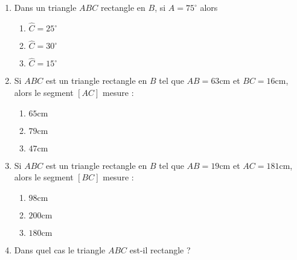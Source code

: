 \documentclass[oneside,twoside]{book}
\begin{document}
\begin{enumerate}
\begin{enumerate}
\end{enumerate}




\item Dans un triangle $ABC$ rectangle en $B$, si $\widehat{A}=75^{\circ}$ alors

\begin{enumerate}

\item\MauvaiseReponse $\widehat{C}=25^{\circ}$

\item\MauvaiseReponse $\widehat{C}=30^{\circ}$

\item\BonneReponse $\widehat{C}=15^{\circ}$

\end{enumerate}



\item Si $ABC$ est un triangle rectangle en $B$ tel que $AB=63\mathrm{cm}$ et $BC=16\mathrm{cm}$, alors le segment $\left[AC\right]$ mesure :

\begin{enumerate}

\item\BonneReponse $65\mathrm{cm}$

\item\MauvaiseReponse $79\mathrm{cm}$

\item\MauvaiseReponse $47\mathrm{cm}$

\end{enumerate}



\item Si $ABC$ est un triangle rectangle en $B$ tel que $AB=19\mathrm{cm}$ et $AC=181\mathrm{cm}$, alors le segment $\left[BC\right]$ mesure :

\begin{enumerate}


\item\MauvaiseReponse $98\mathrm{cm}$

\item\MauvaiseReponse $200\mathrm{cm}$

\item\BonneReponse $180\mathrm{cm}$

\end{enumerate}



\item Dans quel cas le triangle $ABC$ est-il rectangle ?


\end{enumerate}
\end{document}
